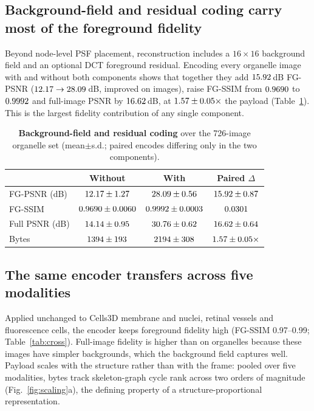 \documentclass[10pt,a4paper]{article}
\begin{document}
\subsection{Background-field and residual coding carry most of the foreground fidelity}
\label{sec:ablation}
Beyond node-level PSF placement, reconstruction includes a $16\times16$
background field and an optional DCT foreground residual. Encoding every
organelle image with and without both components shows that together they
add $15.92$\,dB FG-PSNR ($12.17\to28.09$\,dB,
improved on \AblImproved{} images), raise FG-SSIM from $0.9690$ to
$0.9992$ and full-image PSNR by $16.62$\,dB, at
$1.57\pm0.05\times$ the payload (Table~\ref{tab:ablation}). This is the
largest fidelity contribution of any single component.

\begin{table}[t]
\centering
\caption{\textbf{Background-field and residual coding} over the 726-image
organelle set (mean$\pm$s.d.; paired encodes differing only in the two
components).}
\label{tab:ablation}
\footnotesize
\begin{tabular}{lccc}
\toprule
 & Without & With & Paired $\Delta$\\
\midrule
FG-PSNR (dB)   & $12.17\pm1.27$ & $28.09\pm0.56$ & $15.92\pm0.87$\\
FG-SSIM        & $0.9690\pm0.0060$ & $0.9992\pm0.0003$ & $0.0301$\\
Full PSNR (dB) & $14.14\pm0.95$ & $30.76\pm0.62$ & $16.62\pm0.64$\\
Bytes          & $1394\pm193$ & $2194\pm308$ & $1.57\pm0.05\times$\\
\bottomrule
\end{tabular}
\end{table}

\subsection{The same encoder transfers across five modalities}
\label{sec:cross}
Applied unchanged to Cells3D membrane and nuclei, retinal vessels and
fluorescence cells, the encoder keeps foreground fidelity high (FG-SSIM
0.97--0.99; Table~\ref{tab:cross}). Full-image fidelity is higher than on
organelles because these images have simpler backgrounds, which the
background field captures well. Payload scales with the structure rather
than with the frame: pooled over five modalities, bytes track skeleton-graph
cycle rank across two orders of magnitude (Fig.~\ref{fig:scaling}a), the
defining property of a structure-proportional representation.
\end{document}
